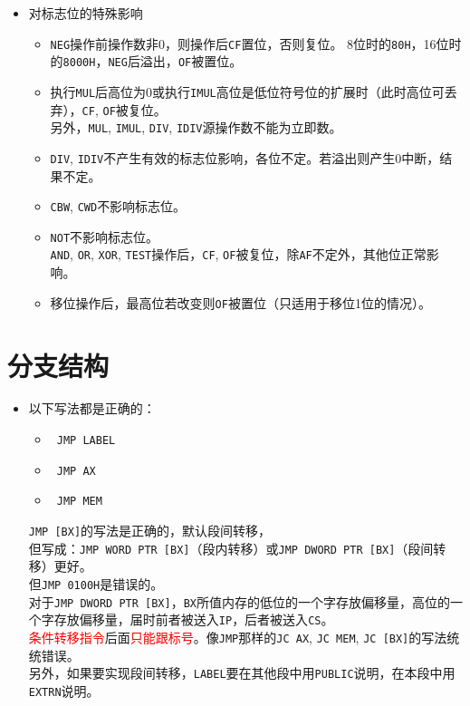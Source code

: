 \documentclass{article}
\begin{document}
\begin{CJK*}{UTF8}{gbsn}
\begin{itemize}
\item
对标志位的特殊影响
\begin{itemize}
\item \verb|NEG|操作前操作数非0，则操作后\verb|CF|置位，否则复位。
8位时的\verb|80H|，16位时的\verb|8000H|，\verb|NEG|后溢出，\verb|OF|被置位。
\item 执行\verb|MUL|后高位为0或执行\verb|IMUL|高位是低位符号位的扩展时（此时高位可丢弃），\verb|CF|, \verb|OF|被复位。 \\
另外，\verb|MUL|, \verb|IMUL|, \verb|DIV|, \verb|IDIV|源操作数不能为立即数。
\item \verb|DIV|, \verb|IDIV|不产生有效的标志位影响，各位不定。若溢出则产生0中断，结果不定。
\item \verb|CBW|, \verb|CWD|不影响标志位。
\item \verb|NOT|不影响标志位。 \\
\verb|AND|, \verb|OR|, \verb|XOR|, \verb|TEST|操作后，\verb|CF|, \verb|OF|被复位，除\verb|AF|不定外，其他位正常影响。
\item 移位操作后，最高位若改变则\verb|OF|被置位（只适用于移位1位的情况）。
\end{itemize}

\end{itemize}

\section{分支结构}

\begin{itemize}

\item
以下写法都是正确的：
\begin{itemize}
\item \verb| JMP LABEL |
\item \verb| JMP AX |
\item \verb| JMP MEM |
\end{itemize}

\verb|JMP [BX]|的写法是正确的，默认段间转移， \\
但写成：\verb|JMP WORD PTR [BX]|（段内转移）或\verb|JMP DWORD PTR [BX]|（段间转移）更好。 \\
但\verb|JMP 0100H|是错误的。 \\
对于\verb|JMP DWORD PTR [BX]|，\verb|BX|所值内存的低位的一个字存放偏移量，高位的一个字存放偏移量，届时前者被送入\verb|IP|，后者被送入\verb|CS|。 \\
\textcolor{red}{条件转移指令}后面\textcolor{red}{只能跟标号}。像\verb|JMP|那样的\verb|JC AX|, \verb|JC MEM|, \verb|JC [BX]|的写法统统错误。 \\
另外，如果要实现段间转移，\verb|LABEL|要在其他段中用\verb|PUBLIC|说明，在本段中用\verb|EXTRN|说明。 \\


\end{itemize}
\end{CJK*}
\end{document}
